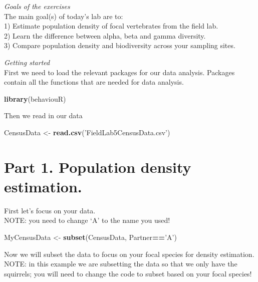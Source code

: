 \documentclass[]{book}
\newenvironment{Shaded}{\begin{snugshade}}{\end{snugshade}}
\newcommand{\KeywordTok}[1]{\textcolor[rgb]{0.13,0.29,0.53}{\textbf{#1}}}
\newcommand{\NormalTok}[1]{#1}
\newcommand{\OperatorTok}[1]{\textcolor[rgb]{0.81,0.36,0.00}{\textbf{#1}}}
\newcommand{\StringTok}[1]{\textcolor[rgb]{0.31,0.60,0.02}{#1}}
\begin{document}
\emph{Goals of the exercises}\\
The main goal(s) of today's lab are to:\\
1) Estimate population density of focal vertebrates from the field lab.\\
2) Learn the difference between alpha, beta and gamma diversity.\\
3) Compare population density and biodiversity across your sampling sites.

\emph{Getting started}\\
First we need to load the relevant packages for our data analysis. Packages contain all the functions that are needed for data analysis.

\begin{Shaded}
\begin{Highlighting}[]
\KeywordTok{library}\NormalTok{(behaviouR)}
\end{Highlighting}
\end{Shaded}

Then we read in our data

\begin{Shaded}
\begin{Highlighting}[]
\NormalTok{CensusData <-}\StringTok{ }\KeywordTok{read.csv}\NormalTok{(}\StringTok{'FieldLab5CensusData.csv'}\NormalTok{)}
\end{Highlighting}
\end{Shaded}

\hypertarget{part-1.-population-density-estimation.}{%
\section*{Part 1. Population density estimation.}\label{part-1.-population-density-estimation.}}

First let's focus on your data.\\
NOTE: you need to change `A' to the name you used!

\begin{Shaded}
\begin{Highlighting}[]
\NormalTok{MyCensusData <-}\StringTok{ }\KeywordTok{subset}\NormalTok{(CensusData, Partner}\OperatorTok{==}\StringTok{'A'}\NormalTok{)}
\end{Highlighting}
\end{Shaded}

Now we will subset the data to focus on your focal species for density estimation. NOTE: in this example we are subsetting the data so that we only have the squirrels; you will need to change the code to subset based on your focal species!
\end{document}

